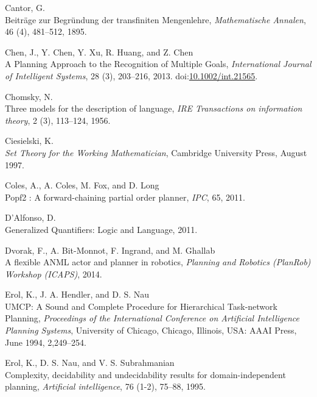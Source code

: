 \documentclass[11pt,a4paper,twoside,openright,titlepage,numbers=noenddot,headinclude,cleardoublepage=empty,openany]{scrreprt}
\theoremstyle{plain}
\theoremstyle{definition}
\theoremstyle{remark}
\begin{document}
\leavevmode\hypertarget{ref-cantor_beitrage_1895}{}%
Cantor, G.\\
Beiträge zur Begründung der transfiniten Mengenlehre,
\emph{Mathematische Annalen}, 46 (4), 481--512, 1895.

\leavevmode\hypertarget{ref-chen_planning_2013}{}%
Chen, J., Y. Chen, Y. Xu, R. Huang, and Z. Chen\\
A Planning Approach to the Recognition of Multiple Goals,
\emph{International Journal of Intelligent Systems}, 28 (3), 203--216,
2013. doi:\href{https://doi.org/10.1002/int.21565}{10.1002/int.21565}.

\leavevmode\hypertarget{ref-chomsky_three_1956}{}%
Chomsky, N.\\
Three models for the description of language, \emph{IRE Transactions on
information theory}, 2 (3), 113--124, 1956.

\leavevmode\hypertarget{ref-ciesielski_set_1997}{}%
Ciesielski, K.\\
\emph{Set Theory for the Working Mathematician}, Cambridge University
Press, August 1997.

\leavevmode\hypertarget{ref-coles_popf2_2011}{}%
Coles, A., A. Coles, M. Fox, and D. Long\\
Popf2 : A forward-chaining partial order planner, \emph{IPC}, 65, 2011.

\leavevmode\hypertarget{ref-dalfonso_generalized_2011}{}%
D'Alfonso, D.\\
Generalized Quantifiers: Logic and Language, 2011.

\leavevmode\hypertarget{ref-dvorak_flexible_2014}{}%
Dvorak, F., A. Bit-Monnot, F. Ingrand, and M. Ghallab\\
A flexible ANML actor and planner in robotics, \emph{Planning and
Robotics (PlanRob) Workshop (ICAPS)}, 2014.

\leavevmode\hypertarget{ref-erol_umcp_1994}{}%
Erol, K., J. A. Hendler, and D. S. Nau\\
UMCP: A Sound and Complete Procedure for Hierarchical Task-network
Planning, \emph{Proceedings of the International Conference on
Artificial Intelligence Planning Systems}, University of Chicago,
Chicago, Illinois, USA: AAAI Press, June 1994, 2,249--254.

\leavevmode\hypertarget{ref-erol_complexity_1995}{}%
Erol, K., D. S. Nau, and V. S. Subrahmanian\\
Complexity, decidability and undecidability results for
domain-independent planning, \emph{Artificial intelligence}, 76 (1-2),
75--88, 1995.
\end{document}
